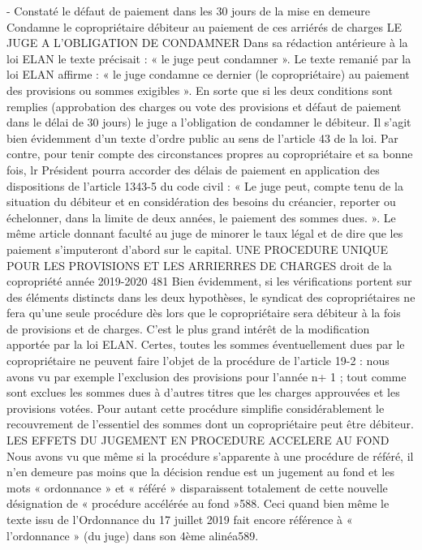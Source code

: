 - Constaté le défaut de paiement dans les 30 jours de la mise en demeure
Condamne le copropriétaire débiteur au paiement de ces arriérés de charges
LE JUGE A L’OBLIGATION DE CONDAMNER
Dans sa rédaction antérieure à la loi ELAN le texte précisait : « le juge peut condamner ».
Le texte remanié par la loi ELAN affirme : « le juge condamne ce dernier (le copropriétaire) au paiement des provisions ou sommes exigibles ».
En sorte que si les deux conditions sont remplies (approbation des charges ou vote des provisions et défaut de paiement dans le délai de 30 jours) le juge a l’obligation de condamner le débiteur. Il s’agit bien évidemment d’un texte d’ordre public au sens de l’article 43 de la loi.
Par contre, pour tenir compte des circonstances propres au copropriétaire et sa bonne fois, lr Président pourra accorder des délais de paiement en application des dispositions de l’article 1343-5 du code civil : « Le juge peut, compte tenu de la situation du débiteur et en considération des besoins du créancier, reporter ou échelonner, dans la limite de deux années, le paiement des sommes dues. ». Le même article donnant faculté au juge de minorer le taux légal et de dire que les paiement s’imputeront d’abord sur le capital.
UNE PROCEDURE UNIQUE POUR LES PROVISIONS ET LES ARRIERRES DE CHARGES
droit de la copropriété année 2019-2020
481
Bien évidemment, si les vérifications portent sur des éléments distincts dans les deux hypothèses, le syndicat des copropriétaires ne fera qu’une seule procédure dès lors que le copropriétaire sera débiteur à la fois de provisions et de charges.
C’est le plus grand intérêt de la modification apportée par la loi ELAN.
Certes, toutes les sommes éventuellement dues par le copropriétaire ne peuvent faire l’objet de la procédure de l’article 19-2 : nous avons vu par exemple l’exclusion des provisions pour l’année n+ 1 ; tout comme sont exclues les sommes dues à d’autres titres que les charges approuvées et les provisions votées. Pour autant cette procédure simplifie considérablement le recouvrement de l’essentiel des sommes dont un copropriétaire peut être débiteur.
LES EFFETS DU JUGEMENT EN PROCEDURE ACCELERE AU FOND
Nous avons vu que même si la procédure s’apparente à une procédure de référé, il n’en demeure pas moins que la décision rendue est un jugement au fond et les mots « ordonnance » et « référé » disparaissent totalement de cette nouvelle désignation de « procédure accélérée au fond »588. Ceci quand bien même le texte issu de l’Ordonnance du 17 juillet 2019 fait encore référence à « l’ordonnance » (du juge) dans son 4ème alinéa589.
